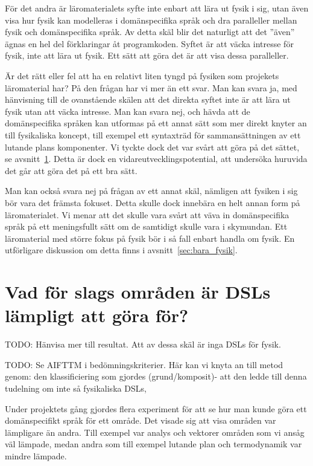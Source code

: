 \begin{binge}
För det andra är läromaterialets syfte inte enbart att lära ut fysik i sig, utan även visa hur fysik kan modelleras i domänspecifika språk och dra paralleller mellan fysik och domänspecifika språk. Av detta skäl blir det naturligt att det ''även'' ägnas en hel del förklaringar åt programkoden. Syftet är att väcka intresse för fysik, inte att lära ut fysik. Ett sätt att göra det är att visa dessa paralleller.

Är det rätt eller fel att ha en relativt liten tyngd på fysiken som projekets läromaterial har? På den frågan har vi mer än ett svar. Man kan svara ja, med hänvisning till de ovanstående skälen att det direkta syftet inte är att lära ut fysik utan att väcka intresse. Man kan svara nej, och hävda att de domänspecifika språken kan utformas på ett annat sätt som mer direkt knyter an till fysikaliska koncept, till exempel ett syntaxträd för sammansättningen av ett lutande plans komponenter. Vi tyckte dock det var svårt att göra på det sättet, se avsnitt~\ref{sec:lampligt}. Detta är dock en vidareutvecklingspotential, att undersöka huruvida det går att göra det på ett bra sätt.

Man kan också svara nej på frågan av ett annat skäl, nämligen att fysiken i sig bör vara det främsta fokuset. Detta skulle dock innebära en helt annan form på läromaterialet. Vi menar att det skulle vara svårt att väva in domänspecifika språk på ett meningsfullt sätt om de samtidigt skulle vara i skymundan. Ett läromaterial med större fokus på fysik bör i så fall enbart handla om fysik. En utförligare diskussion om detta finns i avsnitt~\ref{sec:bara_fysik}.

\section{Vad för slags områden är DSLs lämpligt att göra för?}
\label{sec:lampligt}

TODO: Hänvisa mer till resultat. Att av dessa skäl är inga DSLs för fysik.

TODO: Se AIFTTM i bedömningskriterier. Här kan vi knyta an till metod genom: den klassificiering som gjordes (grund/komposit)- att den ledde till denna tudelning om inte så fysikaliska DSLs, 

Under projektets gång gjordes flera experiment för att se hur man kunde göra ett domänspecifikt språk för ett område. Det visade sig att visa områden var lämpligare än andra. Till exempel var analys och vektorer områden som vi ansåg väl lämpade, medan andra som till exempel lutande plan och termodynamik var mindre lämpade.


\end{binge}
